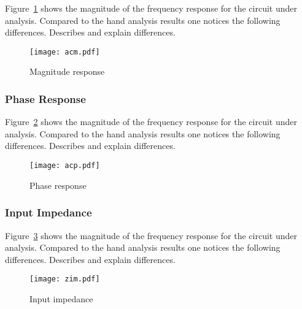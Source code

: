 Figure~\ref{fig:acm} shows the magnitude of the frequency response for the
circuit under analysis. Compared to the hand analysis results one notices the
following differences. Describes and explain differences.

\begin{figure}[h] \centering
\texttt{[image: acm.pdf]}
\caption{Magnitude response}
\label{fig:acm}
\end{figure}

\lipsum[1-2]

\subsubsection{Phase Response}

Figure~\ref{fig:acp} shows the magnitude of the frequency response for the
circuit under analysis. Compared to the hand analysis results one notices the
following differences. Describes and explain differences.

\begin{figure}[h] \centering
\texttt{[image: acp.pdf]}
\caption{Phase response}
\label{fig:acp}
\end{figure}

\lipsum[1-2]

\subsubsection{Input Impedance}

Figure~\ref{fig:zim} shows the magnitude of the frequency response for the
circuit under analysis. Compared to the hand analysis results one notices the
following differences. Describes and explain differences.

\begin{figure}[h] \centering
\texttt{[image: zim.pdf]}
\caption{Input impedance}
\label{fig:zim}
\end{figure}

\lipsum[1-2]

